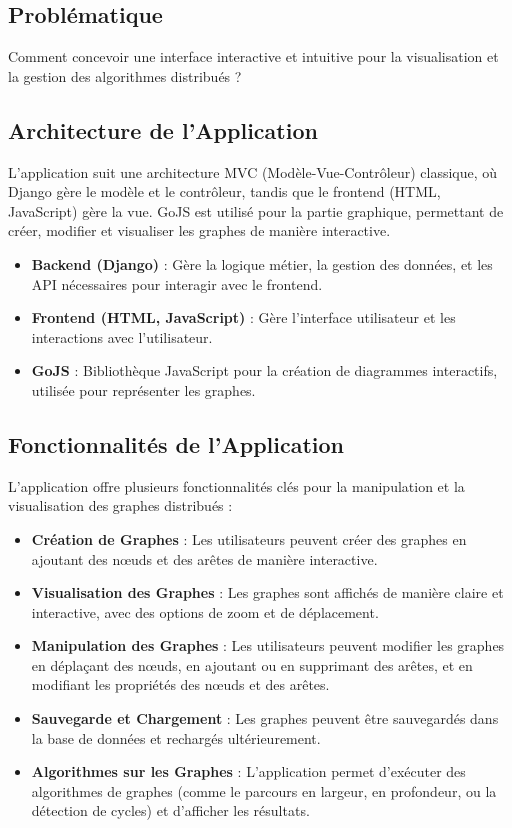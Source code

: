 \documentclass[a4paper,12pt]{article}
\begin{document}
\subsection{Problématique}
Comment concevoir une interface interactive et intuitive pour la visualisation et la gestion des algorithmes distribués ?


\subsection{Architecture de l'Application}
L'application suit une architecture MVC (Modèle-Vue-Contrôleur) classique, où Django gère le modèle et le contrôleur, tandis que le frontend (HTML, JavaScript) gère la vue. GoJS est utilisé pour la partie graphique, permettant de créer, modifier et visualiser les graphes de manière interactive.

\begin{itemize}
    \item \textbf{Backend (Django)} : Gère la logique métier, la gestion des données, et les API nécessaires pour interagir avec le frontend.
    \item \textbf{Frontend (HTML, JavaScript)} : Gère l'interface utilisateur et les interactions avec l'utilisateur.
    \item \textbf{GoJS} : Bibliothèque JavaScript pour la création de diagrammes interactifs, utilisée pour représenter les graphes.
\end{itemize}

\subsection{Fonctionnalités de l'Application}
L'application offre plusieurs fonctionnalités clés pour la manipulation et la visualisation des graphes distribués :

\begin{itemize}
    \item \textbf{Création de Graphes} : Les utilisateurs peuvent créer des graphes en ajoutant des nœuds et des arêtes de manière interactive.
    \item \textbf{Visualisation des Graphes} : Les graphes sont affichés de manière claire et interactive, avec des options de zoom et de déplacement.
    \item \textbf{Manipulation des Graphes} : Les utilisateurs peuvent modifier les graphes en déplaçant des nœuds, en ajoutant ou en supprimant des arêtes, et en modifiant les propriétés des nœuds et des arêtes.
    \item \textbf{Sauvegarde et Chargement} : Les graphes peuvent être sauvegardés dans la base de données et rechargés ultérieurement.
    \item \textbf{Algorithmes sur les Graphes} : L'application permet d'exécuter des algorithmes de graphes (comme le parcours en largeur, en profondeur, ou la détection de cycles) et d'afficher les résultats.
\end{itemize}
\end{document}
